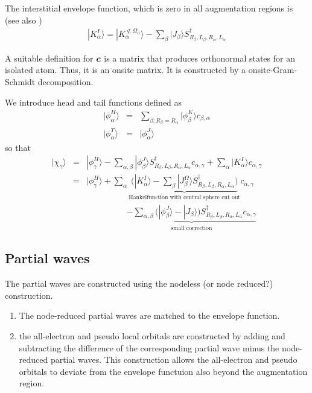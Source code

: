 \documentclass[11pt,a4paper]{report}
\begin{document}
The interstitial envelope function, which is zero in all augmentation
regions is (see also )
\begin{eqnarray}
|K^I_\alpha\rangle= |K^{\notin\Omega_\alpha}_\alpha\rangle
-\sum_{\beta}|J_{\beta}\rangle
S^\dagger_{R_\beta,L_\beta,R_\alpha,L_\alpha}
\end{eqnarray}


A suitable definition for $\bm{c}$ is a matrix that produces
orthonormal states for an isolated atom. Thus, it is an onsite matrix.
It is constructed by a onsite-Gram-Schmidt decomposition.

We introduce head and tail functions defined as
\begin{eqnarray}
|\phi^H_\alpha\rangle&=&\sum_{\beta; R_\beta=R_\alpha}
|\phi^K_\beta\rangle c_{\beta,\alpha}
\nonumber\\
|\phi^T_\alpha\rangle&=&|\phi^J_\alpha\rangle
\end{eqnarray}
so that
\begin{eqnarray}
|\chi_\gamma\rangle
&=&
|\phi^{H}_{\gamma}\rangle
-\sum_{\alpha,\beta}
|\phi^J_{\beta}\rangle S^\dagger_{R_\beta,L_\beta,R_\alpha,L_\alpha}
c_{\alpha,\gamma}
+\sum_\alpha |K^{I}_\alpha\rangle c_{\alpha,\gamma}
\nonumber\\
&=&
|\phi^{H}_{\gamma}\rangle
+
\sum_\alpha\underbrace{
\biggl(
|K^{I}_\alpha\rangle 
-\sum_{\beta}
|J^\Omega_{\beta}\rangle S^\dagger_{R_\beta,L_\beta,R_\alpha,L_\alpha}
\biggr)
}_{\text{Hankelfunction with central sphere cut out}}
c_{\alpha,\gamma}
\nonumber\\
&&\hspace{2cm}\underbrace{
-\sum_{\alpha,\beta}
\biggl(
|\phi^J_{\beta}\rangle 
-|J_{\beta}\rangle 
\biggr)
S^\dagger_{R_\beta,L_\beta,R_\alpha,L_\alpha}
c_{\alpha,\gamma}
}_{\text{small correction}}
\label{eq:deflocalorbital}
\end{eqnarray}



\subsection{Partial waves}
The partial waves are constructed using the nodeless (or node
reduced?) construction. 

\begin{enumerate}
\item The node-reduced partial waves are matched to the envelope
  function.
\item the all-electron and pseudo local orbitals are constructed by
  adding and subtracting the difference of the corresponding partial
  wave minus the node-reduced partial waves. This construction allows
  the all-electron and pseudo orbitals to deviate from the envelope
  functuion also beyond the augmentation region.
\end{enumerate}
\end{document}
